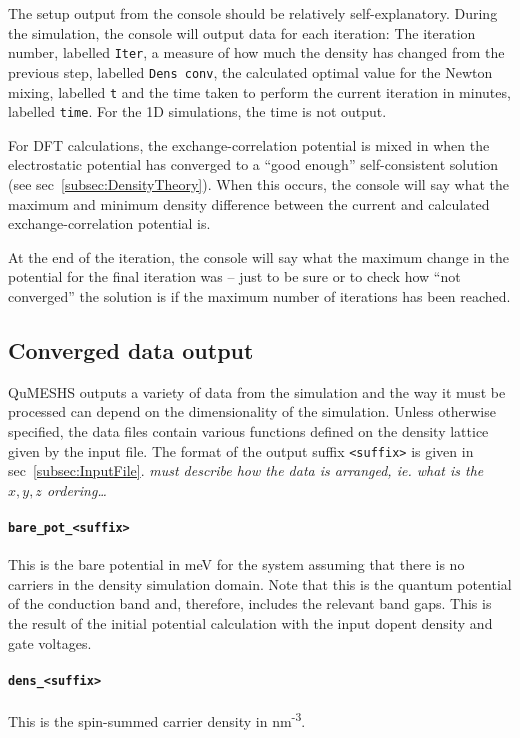 \documentclass[12pt]{article}
\newcommand{\red}[1]{{\color{red} \it #1}}
\begin{document}
The setup output from the console should be relatively self-explanatory.  During the simulation,
the console will output data for each iteration:  The iteration number, labelled \texttt{Iter},
a measure of how much the density has changed from the previous step, labelled \texttt{Dens conv},
the calculated optimal value for the Newton mixing, labelled \texttt{t} and the time taken to
perform the current iteration in minutes, labelled \texttt{time}.  For the 1D simulations, the
time is not output.

For DFT calculations, the exchange-correlation potential is mixed in when the electrostatic
potential has converged to a ``good enough'' self-consistent solution (see
sec~\ref{subsec:DensityTheory}).  When this occurs, the console will say what the maximum
and minimum density difference between the current and calculated exchange-correlation potential
is.

At the end of the iteration, the console will say what the maximum change in the potential for
the final iteration was -- just to be sure or to check how ``not converged'' the solution is
if the maximum number of iterations has been reached.


\subsection{Converged data output}
\label{subsec:DataOutput}

QuMESHS outputs a variety of data from the simulation and the way it must be processed can
depend on the dimensionality of the simulation.  Unless otherwise specified, the data
files contain various functions defined on the density lattice given by the input file.
The format of the output suffix \texttt{<suffix>} is given in sec~\ref{subsec:InputFile}.
\red{must describe how the data is arranged, ie. what is the $x, y, z$ ordering\ldots}

\paragraph{\texttt{bare\_pot\_<suffix>}}
This is the bare potential in meV for the system assuming that there is no carriers in
the density simulation domain.  Note that this is the quantum potential of the conduction
band and, therefore, includes the relevant band gaps.  This is the result of the initial
potential calculation with the input dopent density and gate voltages.

\paragraph{\texttt{dens\_<suffix>}}
This is the spin-summed carrier density in nm\textsuperscript{-3}.
\end{document}
